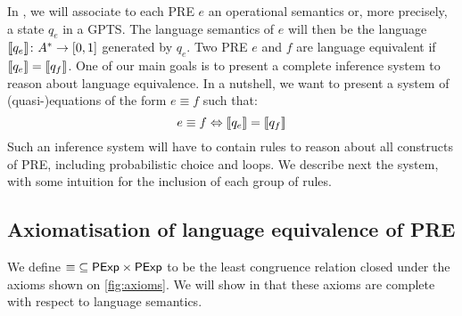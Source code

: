 In , we will associate to each {PRE} $e$ an operational semantics or, more precisely, a state $q_e$ in a {GPTS}. The language semantics of $e$ will then be the language $\llbracket q_e \rrbracket \colon \alphabet^\ast \to \interval{0}{1}$ generated by $q_e$. Two {PRE} $e$ and $f$ are language equivalent if $\left\llbracket{q_e}\right\rrbracket=\left\llbracket{q_f}\right\rrbracket$. One of our main goals is to present a complete inference system to reason about language equivalence. In a nutshell, we want to present a system of (quasi-)equations of the form $e \equiv f$ such that:
\[
e\equiv f \Leftrightarrow \left\llbracket{q_e}\right\rrbracket = \left\llbracket{q_f}\right\rrbracket
\]
Such an inference system will have to contain rules to reason about all constructs of {PRE}, including probabilistic choice and loops. We describe next the system, with some intuition for the inclusion of each group of rules. 

\subsection{Axiomatisation of language equivalence of {PRE}} 
We define ${\equiv} \subseteq \mathsf{PExp} \times \mathsf{PExp}$ to be the least congruence relation closed under the axioms shown on \cref{fig:axioms}. We will show in  that these axioms are complete with respect to language semantics. 

